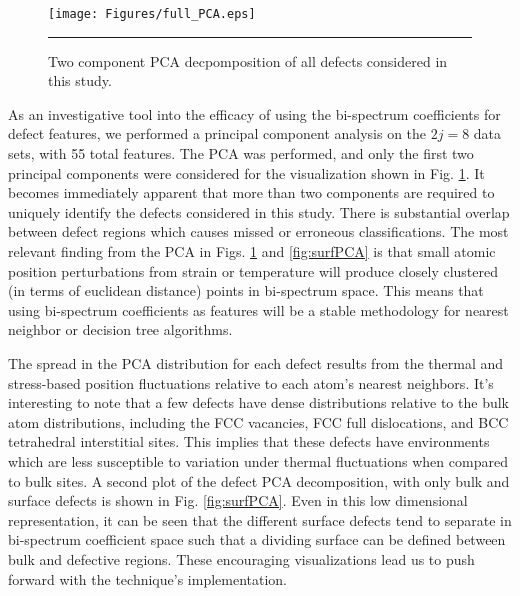 \documentclass[12pt]{iopart}
\begin{document}
\begin{figure}[htbp]
  \centering
    \texttt{[image: Figures/full\_PCA.eps]}
    \rule{35em}{0.5pt}
  \caption[]{Two component PCA decpomposition of all defects considered in this study.}
  \label{fig:PCA}
\end{figure}

As an investigative tool into the efficacy of using the bi-spectrum coefficients for defect features, we performed a principal component analysis on the $2j=8$ data sets, with 55 total features. The PCA was performed, and only the first two principal components were considered for the visualization shown in Fig. \ref{fig:PCA}. It becomes immediately apparent that more than two components are required to uniquely identify the defects considered in this study. There is substantial overlap between defect regions which causes missed or erroneous classifications. The most relevant finding from the PCA in Figs. \ref{fig:PCA} and \ref{fig:surfPCA} is that small atomic position perturbations from strain or temperature will produce closely clustered (in terms of euclidean distance) points in bi-spectrum space. This means that using bi-spectrum coefficients as features will be a stable methodology for nearest neighbor or decision tree algorithms.

The spread in the PCA distribution for each defect results from the thermal and stress-based position fluctuations relative to each atom's nearest neighbors. It's interesting to note that a few defects have dense distributions relative to the bulk atom distributions, including the FCC vacancies, FCC full dislocations, and BCC tetrahedral interstitial sites. This implies that these defects have environments which are less susceptible to variation under thermal fluctuations when compared to bulk sites. A second plot of the defect PCA decomposition, with only bulk and surface defects is shown in Fig. \ref{fig:surfPCA}. Even in this low dimensional representation, it can be seen that the different surface defects tend to separate in bi-spectrum coefficient space such that a dividing surface can be defined between bulk and defective regions. These encouraging visualizations lead us to push forward with the technique's implementation.
\end{document}

